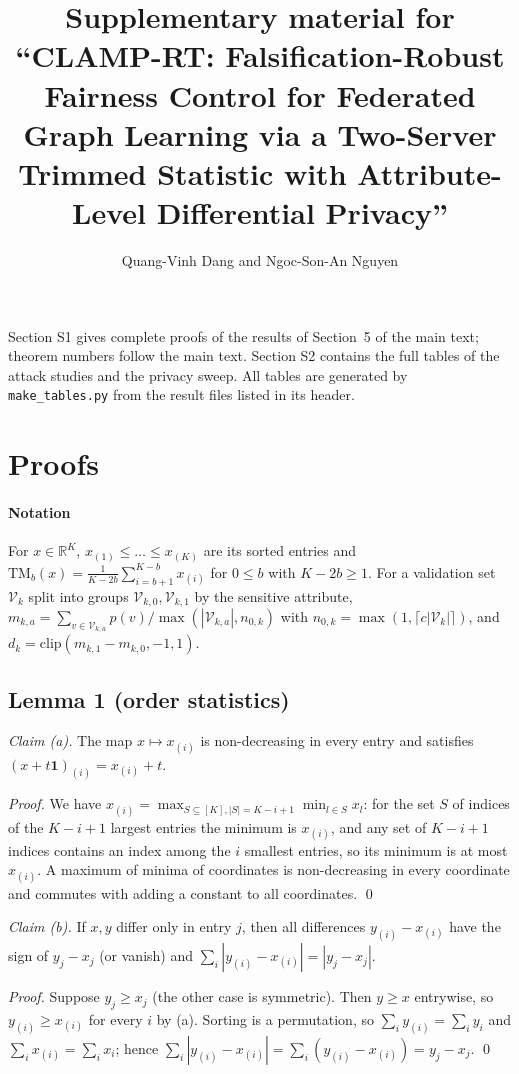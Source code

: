\documentclass[11pt]{article}
\title{Supplementary material for\\``CLAMP-RT: Falsification-Robust Fairness Control for Federated Graph Learning via a Two-Server Trimmed Statistic with Attribute-Level Differential Privacy''}
\author{Quang-Vinh Dang and Ngoc-Son-An Nguyen}
\date{}
\theoremstyle{plain}
\theoremstyle{definition}
\newcommand{\R}{\mathbb{R}}
\newcommand{\TM}{\mathrm{TM}_b}
\begin{document}
\maketitle

\noindent Section S1 gives complete proofs of the results of Section~5 of the main text; theorem numbers follow the main text. Section S2 contains the full tables of the attack studies and the privacy sweep. All tables are generated by \texttt{make\_tables.py} from the result files listed in its header.

\section{Proofs}

\paragraph{Notation}
For $x\in\R^K$, $x_{(1)}\le\dots\le x_{(K)}$ are its sorted entries and $\TM(x)=\frac{1}{K-2b}\sum_{i=b+1}^{K-b}x_{(i)}$ for $0\le b$ with $K-2b\ge1$. For a validation set $\mathcal{V}_k$ split into groups $\mathcal{V}_{k,0},\mathcal{V}_{k,1}$ by the sensitive attribute, $m_{k,a}=\sum_{v\in\mathcal{V}_{k,a}}p(v)/\max(|\mathcal{V}_{k,a}|,n_{0,k})$ with $n_{0,k}=\max(1,\lceil c|\mathcal{V}_k|\rceil)$, and $d_k=\mathrm{clip}(m_{k,1}-m_{k,0},-1,1)$.

\subsection*{Lemma 1 (order statistics)}
\emph{Claim (a).} The map $x\mapsto x_{(i)}$ is non-decreasing in every entry and satisfies $(x+t\mathbf{1})_{(i)}=x_{(i)}+t$.

\emph{Proof.} We have $x_{(i)}=\max_{S\subseteq[K],|S|=K-i+1}\min_{l\in S}x_l$: for the set $S$ of indices of the $K-i+1$ largest entries the minimum is $x_{(i)}$, and any set of $K-i+1$ indices contains an index among the $i$ smallest entries, so its minimum is at most $x_{(i)}$. A maximum of minima of coordinates is non-decreasing in every coordinate and commutes with adding a constant to all coordinates. \qed

\emph{Claim (b).} If $x,y$ differ only in entry $j$, then all differences $y_{(i)}-x_{(i)}$ have the sign of $y_j-x_j$ (or vanish) and $\sum_i|y_{(i)}-x_{(i)}|=|y_j-x_j|$.

\emph{Proof.} Suppose $y_j\ge x_j$ (the other case is symmetric). Then $y\ge x$ entrywise, so $y_{(i)}\ge x_{(i)}$ for every $i$ by (a). Sorting is a permutation, so $\sum_i y_{(i)}=\sum_i y_i$ and $\sum_i x_{(i)}=\sum_i x_i$; hence $\sum_i|y_{(i)}-x_{(i)}|=\sum_i(y_{(i)}-x_{(i)})=y_j-x_j$. \qed
\end{document}
